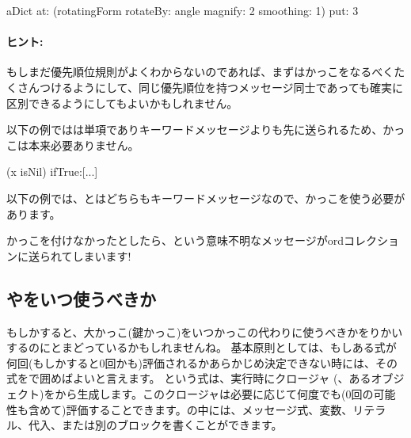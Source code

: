 \documentclass[a4paper,10pt,twoside]{book}
\begin{document}
\begin{code}{}
aDict
   at: (rotatingForm 
          rotateBy: angle	
          magnify: 2 
          smoothing: 1)
   put: 3
\end{code}



\paragraph{ヒント:} もしまだ優先順位規則がよくわからないのであれば、まずはかっこをなるべくたくさんつけるようにして、同じ優先順位を持つメッセージ同士であっても確実に区別できるようにしてもよいかもしれません。

以下の例ではは単項でありキーワードメッセージよりも先に送られるため、かっこは本来必要ありません。
\begin{code}{}
(x isNil)
   ifTrue:[...]
\end{code}

以下の例では、とはどちらもキーワードメッセージなので、かっこを使う必要があります。
\noindent
かっこを付けなかったとしたら、という意味不明なメッセージがordコレクションに送られてしまいます!

\subsection{\lct{[ ]}や\lct{( )}をいつ使うべきか}
もしかすると、大かっこ(鍵かっこ)をいつかっこの代わりに使うべきかをりかいするのにとまどっているかもしれませんね。
基本原則としては、もしある式が何回(もしかすると0回かも)評価されるかあらかじめ決定できない時には、その式を\ct{[ ]}で囲めばよいと言えます。
という式は、実行時にクロージャ (\ie 、あるオブジェクト)をから生成します。このクロージャは必要に応じて何度でも(0回の可能性も含めて)評価することできます。\ct{[ ]}の中には、メッセージ式、変数、リテラル、代入、または別のブロックを書くことができます。
\end{document}
